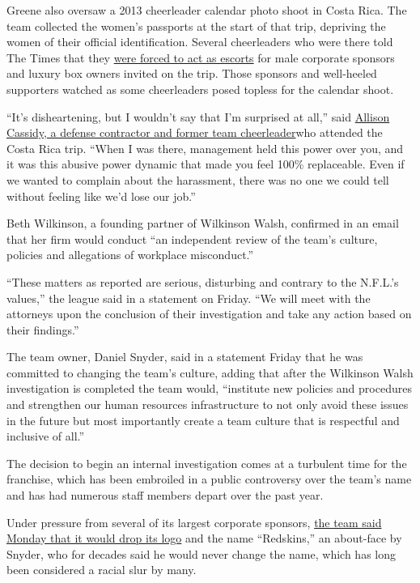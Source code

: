 Greene also oversaw a 2013 cheerleader calendar photo shoot in Costa
Rica. The team collected the women's passports at the start of that
trip, depriving the women of their official identification. Several
cheerleaders who were there told The Times that they
\href{https://www.nytimes3xbfgragh.onion/2018/05/02/sports/redskins-cheerleaders-nfl.html}{were
forced to act as escorts} for male corporate sponsors and luxury box
owners invited on the trip. Those sponsors and well-heeled supporters
watched as some cheerleaders posed topless for the calendar shoot.

``It's disheartening, but I wouldn't say that I'm surprised at all,''
said
\href{https://www.nytimes3xbfgragh.onion/2018/09/27/sports/nfl-cheerleaders-redskins.html}{Allison
Cassidy, a defense contractor and former team cheerleader}who attended
the Costa Rica trip. ``When I was there, management held this power over
you, and it was this abusive power dynamic that made you feel 100\%
replaceable. Even if we wanted to complain about the harassment, there
was no one we could tell without feeling like we'd lose our job.''

Beth Wilkinson, a founding partner of Wilkinson Walsh, confirmed in an
email that her firm would conduct ``an independent review of the team's
culture, policies and allegations of workplace misconduct.''

``These matters as reported are serious, disturbing and contrary to the
N.F.L.'s values,'' the league said in a statement on Friday. ``We will
meet with the attorneys upon the conclusion of their investigation and
take any action based on their findings.''

The team owner, Daniel Snyder, said in a statement Friday that he was
committed to changing the team's culture, adding that after the
Wilkinson Walsh investigation is completed the team would, ``institute
new policies and procedures and strengthen our human resources
infrastructure to not only avoid these issues in the future but most
importantly create a team culture that is respectful and inclusive of
all.''

The decision to begin an internal investigation comes at a turbulent
time for the franchise, which has been embroiled in a public controversy
over the team's name and has had numerous staff members depart over the
past year.

Under pressure from several of its largest corporate sponsors,
\href{https://www.nytimes3xbfgragh.onion/2020/07/13/sports/football/washington-redskins-new-name.html}{the
team said Monday that it would drop its logo} and the name ``Redskins,''
an about-face by Snyder, who for decades said he would never change the
name, which has long been considered a racial slur by many.

